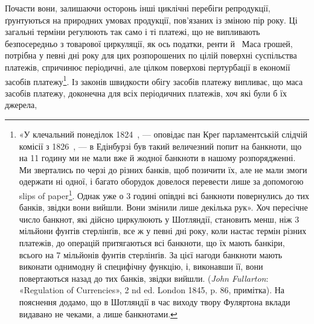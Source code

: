 Почасти вони, залишаючи осторонь інші циклічні перебіги
репродукції, ґрунтуються на природних умовах продукції,
пов’язаних із зміною пір року. Ці загальні терміни регулюють
так само і ті платежі, що не випливають безпосередньо з товарової
циркуляції, як ось податки, ренти й~ Маса грошей, потрібна
у певні дні року для цих розпорошених по цілій поверхні суспільства
платежів, спричинює періодичні, але цілком поверхові пертурбації
в економії засобів платежу\footnote{
«У клечальний понеділок 1824~, — оповідає пан Креґ парламентській
слідчій комісії з 1826~, — в Едінбурзі був такий величезний попит
на банкноти, що на 11 годину ми не мали вже й жодної банкноти в нашому
розпорядженні. Ми звертались по черзі до різних банків, щоб позичити
їх, але не мали змоги одержати ні одної, і багато оборудок довелося перевести
лише за допомогою slips of paper\footnote*{
— шматків паперу. \emph{Ред.}
}. Однак уже о 3 годині опівдні
всі банкноти повернулись до тих банків, звідки вони вийшли. Вони змінили
лише декілька рук». Хоч пересічне число банкнот, які дійсно циркулюють
у Шотляндії, становить менш, ніж 3 мільйони фунтів стерлінґів,
все ж у певні дні року, коли настає термін різних платежів, до операцій
притягаються всі банкноти, що їх мають банкіри, всього на 7 мільйонів
фунтів стерлінґів. За цієї нагоди банкноти мають виконати однимодну
й специфічну функцію, і, виконавши її, вони повертаються назад
до тих банків, звідки вийшли. (\emph{John Fullarton}: «Regulation of Currencies»,
2 nd ed. London 1845, p. 86, примітка). На пояснення додамо, що в Шотляндії
в час виходу твору Фуляртона вклади видавано не чеками, а лише
банкнотами.
}. Із законів швидкости
обігу засобів платежу випливає, що маса засобів платежу, доконечна
для всіх періодичних платежів, хоч які були б їх джерела,
